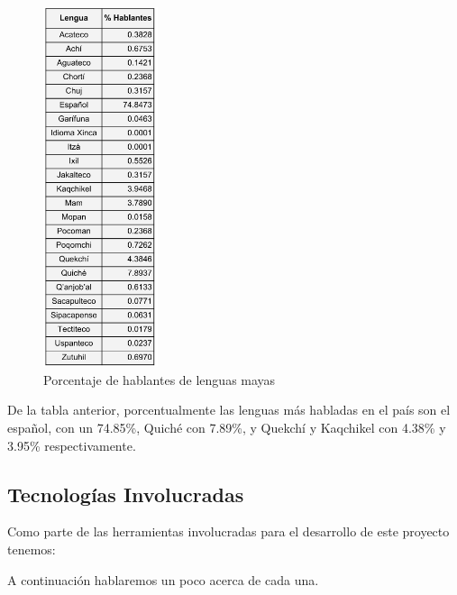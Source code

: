 \documentclass[a4paper,openright,11pt]{article}
\begin{document}
\begin{figure}[H]
	\centering
	\includegraphics[width=0.3\textwidth]{porhablantes}
	\caption{Porcentaje de hablantes de lenguas mayas}
	\label{fig:porc}
\end{figure}
De la tabla anterior, porcentualmente las lenguas más habladas en el país son el español, con un 74.85\%, Quiché con 7.89\%, y Quekchí y Kaqchikel con 4.38\% y 3.95\% respectivamente.

\newpage
\subsection{Tecnologías Involucradas}
Como parte de las herramientas involucradas para el desarrollo de este proyecto tenemos:
\begin{table}[H]
	\begin{center}
	\end{center}
	\caption{Tecnologías Involucradas}
\end{table}
A continuación hablaremos un poco acerca de cada una.
\end{document}

